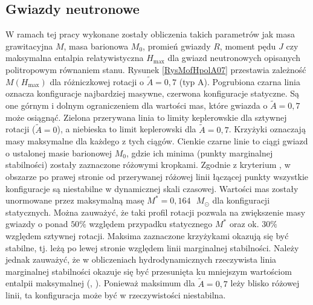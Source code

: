\documentclass{bachelor_thesis}
\begin{document}
        \subsection{Gwiazdy neutronowe}
            W ramach tej pracy wykonane zostały obliczenia takich parametrów jak masa grawitacyjna $M$, masa barionowa $M_0$, promień gwiazdy $R$, moment pędu $J$ czy maksymalna entalpia relatywistyczna $H_\textrm{max}$ dla gwiazd neutronowych opisanych politropowym równaniem stanu. Rysunek \ref{RysMofHpolA07} przestawia zależność $M(H_{\textrm{max}})$ dla różniczkowej rotacji o $\tilde{A}=0,7$ (typ A). Pogrubiona czarna linia oznacza konfiguracje najbardziej masywne, czerwona konfiguracje statyczne. Są one górnym i dolnym ograniczeniem dla wartości mas, które gwiazda o $\tilde{A}=0,7$ może osiągnąć. Zielona przerywana linia to limity keplerowskie dla sztywnej rotacji ($\tilde{A}=0$), a niebieska to limit keplerowski dla $\tilde{A}=0,7$. Krzyżyki oznaczają masy maksymalne dla każdego z tych ciągów. Cienkie czarne linie to ciągi gwiazd o ustalonej masie barionowej $M_0$, gdzie ich minima (punkty marginalnej stabilności) zostały zaznaczone różowymi kropkami. Zgodnie z kryterium \cite{Friedman1988}, w obszarze po prawej stronie od przerywanej różowej linii łączącej punkty wszystkie konfiguracje są niestabilne w dynamicznej skali czasowej. Wartości mas zostały unormowane przez maksymalną masę $M^*=0,164\textrm{ }M_\odot$ dla konfiguracji statycznych. Można zauważyć, że taki profil rotacji pozwala na zwiększenie masy gwiazdy o ponad $50 \%$ względem przypadku statycznego $M^*$ oraz ok. $30 \%$ względem sztywnej rotacji. Maksima zaznaczone krzyżykami okazują się być stabilne, tj. leżą po lewej stronie względem linii marginalnej stabilności. Należy jednak zauważyć, że w obliczeniach hydrodynamicznych rzeczywista linia marginalnej stabilności okazuje się być przesunięta ku mniejszym wartościom entalpii maksymalnej (\citealp{Giacomazzo2011}, \cite{Weih2018}). Ponieważ maksimum dla $\tilde{A}=0,7$ leży blisko różowej linii, ta konfiguracja może być w rzeczywistości niestabilna.\\
\end{document}
